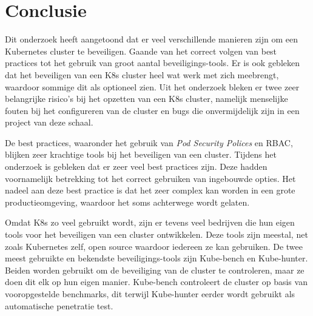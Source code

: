 
\chapter{Conclusie}
\label{ch:conclusie}




	

Dit onderzoek heeft aangetoond dat er veel verschillende manieren zijn om een Kubernetes cluster te beveiligen. Gaande van het correct volgen van best practices tot het gebruik van groot aantal beveiligings-tools. Er is ook gebleken dat het beveiligen van een K8s cluster heel wat werk met zich meebrengt, waardoor sommige dit als optioneel zien. Uit het onderzoek bleken er twee zeer belangrijke risico's bij het opzetten van een K8s cluster, namelijk menselijke fouten bij het configureren van de cluster en bugs die onvermijdelijk zijn in een project van deze schaal.

De best practices, waaronder het gebruik van \textit{Pod Security Polices} en RBAC, blijken zeer krachtige tools bij het beveiligen van een cluster. Tijdens het onderzoek is gebleken dat er zeer veel best practices zijn. Deze hadden voornamelijk betrekking tot het correct gebruiken van ingebouwde opties. Het nadeel aan deze best practice is dat het zeer complex kan worden in een grote productieomgeving, waardoor het soms achterwege wordt gelaten. 

Omdat K8s zo veel gebruikt wordt, zijn er tevens veel bedrijven die hun eigen tools voor het beveiligen van een cluster ontwikkelen. Deze tools zijn meestal, net zoals Kubernetes zelf, open source waardoor iedereen ze kan gebruiken. De twee meest gebruikte en bekendste beveiligings-tools zijn Kube-bench en Kube-hunter. Beiden worden gebruikt om de beveiliging van de cluster te controleren, maar ze doen dit elk op hun eigen manier. Kube-bench controleert de cluster op basis van vooropgestelde benchmarks, dit terwijl Kube-hunter eerder wordt gebruikt als automatische penetratie test.

